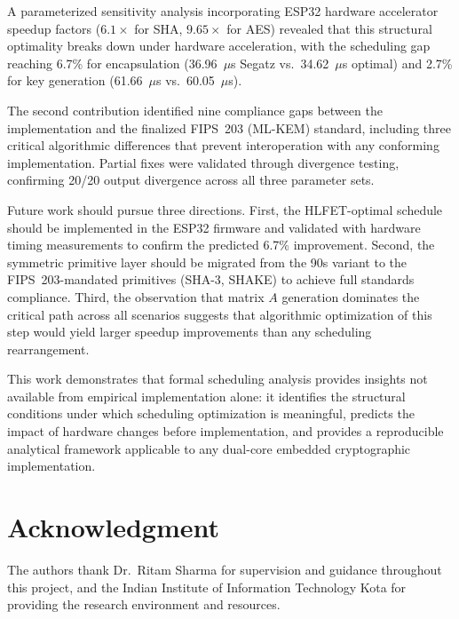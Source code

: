 \documentclass[journal]{IEEEtran}
\begin{document}
A parameterized sensitivity analysis incorporating ESP32 hardware accelerator speedup factors ($6.1\times$ for SHA, $9.65\times$ for AES) revealed that this structural optimality breaks down under hardware acceleration, with the scheduling gap reaching 6.7\% for encapsulation (36.96~$\mu$s Segatz vs.\ 34.62~$\mu$s optimal) and 2.7\% for key generation (61.66~$\mu$s vs.\ 60.05~$\mu$s).

The second contribution identified nine compliance gaps between the implementation and the finalized FIPS~203 (ML-KEM) standard, including three critical algorithmic differences that prevent interoperation with any conforming implementation. Partial fixes were validated through divergence testing, confirming 20/20 output divergence across all three parameter sets.

Future work should pursue three directions. First, the HLFET-optimal schedule should be implemented in the ESP32 firmware and validated with hardware timing measurements to confirm the predicted 6.7\% improvement. Second, the symmetric primitive layer should be migrated from the 90s variant to the FIPS~203-mandated primitives (SHA-3, SHAKE) to achieve full standards compliance. Third, the observation that matrix $A$ generation dominates the critical path across all scenarios suggests that algorithmic optimization of this step would yield larger speedup improvements than any scheduling rearrangement.

This work demonstrates that formal scheduling analysis provides insights not available from empirical implementation alone: it identifies the structural conditions under which scheduling optimization is meaningful, predicts the impact of hardware changes before implementation, and provides a reproducible analytical framework applicable to any dual-core embedded cryptographic implementation.


\section*{Acknowledgment}

The authors thank Dr.\ Ritam Sharma for supervision and guidance throughout this project, and the Indian Institute of Information Technology Kota for providing the research environment and resources.
\end{document}
